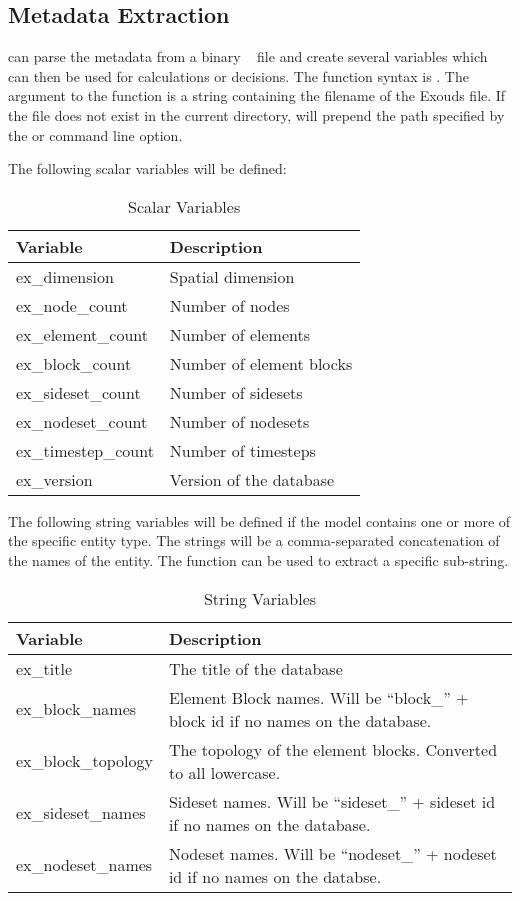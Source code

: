 \subsection{\exo{} Metadata Extraction} \aprepro{} can parse the
metadata from a binary \exo{}~\cite{exodus} file and create several
variables which can then be used for calculations or decisions.  The
function syntax is . The
argument to the function is a string containing the filename of the
Exouds file.  If the file does not exist in the current directory,
\aprepro{} will prepend the path specified by the  or
 command line option.

The following scalar variables will be defined:

\begin{longtable}{lp{4.0in}}
\caption{\exo{} Scalar Variables}\\
Variable              & Description \\
\hline
\endhead
ex\_dimension        & Spatial dimension \\
ex\_node\_count      & Number of nodes \\
ex\_element\_count   & Number of elements \\
ex\_block\_count     & Number of element blocks \\
ex\_sideset\_count   & Number of sidesets \\
ex\_nodeset\_count   & Number of nodesets \\
ex\_timestep\_count  & Number of timesteps \\
ex\_version          & Version of the \exo{} database \\
\hline 
\end{longtable}

The following string variables will be defined if the model contains
one or more of the specific entity type.  The strings will be a
comma-separated concatenation of the names of the entity.  The
 function can be used to extract a specific sub-string.

\begin{longtable}{lp{4.0in}}
\caption{\exo{} String Variables}\\
Variable              & Description \\
\hline
\endhead
ex\_title            & The title of the database \\
ex\_block\_names     & Element Block names.  Will be ``block\_'' +
block id if no names on the database. \\
ex\_block\_topology  & The topology of the element blocks.  Converted
to all lowercase. \\
ex\_sideset\_names   & Sideset names.  Will be ``sideset\_'' + sideset
id if no names on the database. \\
ex\_nodeset\_names   & Nodeset names.  Will be ``nodeset\_'' + nodeset
id if no names on the databse. \\
\hline 
\end{longtable}

